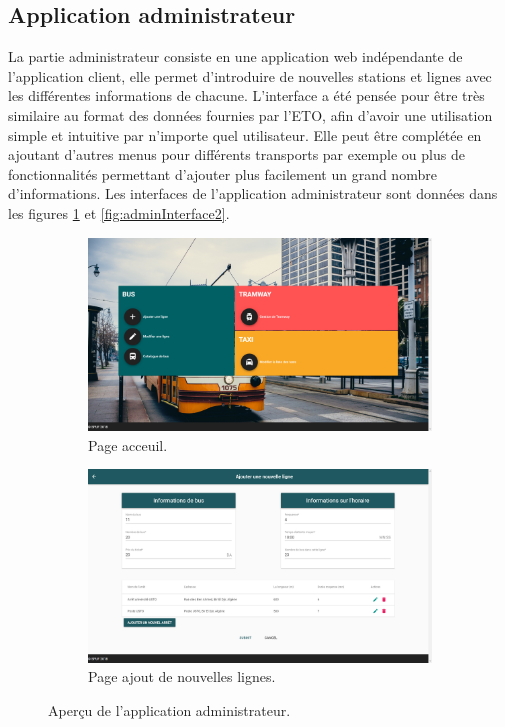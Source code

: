 \subsection{Application administrateur}
La partie administrateur consiste en une application web indépendante de l'application client, elle permet d'introduire de nouvelles stations et lignes avec les différentes informations de chacune.
L'interface a été pensée pour être très similaire au format des données fournies par l'ETO, afin d'avoir une utilisation simple et intuitive par n'importe quel utilisateur.
Elle peut être complétée en ajoutant d'autres menus pour différents transports par exemple ou plus de fonctionnalités permettant d'ajouter plus facilement un grand nombre d'informations.\newline
Les interfaces de l'application administrateur sont données dans les figures \ref{fig:adminInterface} et \ref{fig:adminInterface2}.
\begin{figure}[h!]
	 \begin{subfigure}[b]{\linewidth}
	 	\includegraphics[width=\linewidth]{img/spuf/adminmenu.png}
	 	\caption{Page acceuil.}
	 \end{subfigure}
	 
	 \begin{subfigure}[b]{\linewidth}
	 	\includegraphics[width=\linewidth]{img/spuf/addline.png}
	 	\caption{Page ajout de nouvelles lignes.}
	 \end{subfigure}
	 \caption{Aperçu de l'application administrateur.}
	 \label{fig:adminInterface}
\end{figure}

